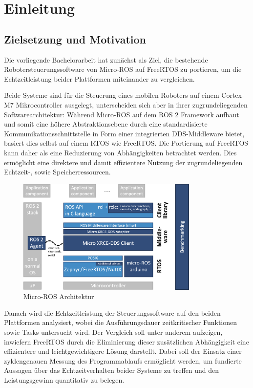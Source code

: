 \section{Einleitung}

\subsection{Zielsetzung und Motivation}

Die vorliegende Bachelorarbeit hat zunächst als Ziel, die bestehende
Robotersteuerungssoftware von Micro-ROS auf FreeRTOS zu portieren, um die
Echtzeitleistung beider Plattformen miteinander zu vergleichen.

Beide Systeme sind für die Steuerung eines mobilen Roboters auf einem Cortex-M7
Mikrocontroller ausgelegt, unterscheiden sich aber in ihrer zugrundeliegenden
Softwarearchitektur: Während Micro-ROS auf dem \ac{ROS 2} Framework aufbaut und
somit eine höhere Abstraktionsebene durch eine standardisierte
Kommunikationsschnittstelle in Form einer integrierten \ac{DDS}-Middleware
bietet, basiert dies selbst auf einem \ac{RTOS} wie FreeRTOS. Die Portierung auf
FreeRTOS kann daher als eine Reduzierung von Abhängigkeiten betrachtet werden.
Dies ermöglicht eine direktere und damit effizientere Nutzung der
zugrundeliegenden Echtzeit-, sowie Speicherressourcen.

\begin{figure}[htb] \centering
    \includegraphics[width=0.8\textwidth]{assets/Micro-ROS_architecture}
    \caption{Micro-ROS Architektur\cite[S. 6]{koubaa2023}}
\end{figure}

Danach wird die Echtzeitleistung der Steuerungssoftware auf den beiden
Plattformen analysiert, wobei die Ausführungsdauer zeitkritischer Funktionen
sowie Tasks untersucht wird. Der Vergleich soll unter anderem aufzeigen,
inwiefern FreeRTOS durch die Eliminierung dieser zusätzlichen Abhängigkeit eine
effizientere und leichtgewichtigere Lösung darstellt. Dabei soll der Einsatz
einer zyklengenauen Messung des Programmablaufs ermöglicht werden, um fundierte
Aussagen über das Echtzeitverhalten beider Systeme zu treffen und den
Leistungsgewinn quantitativ zu belegen.

